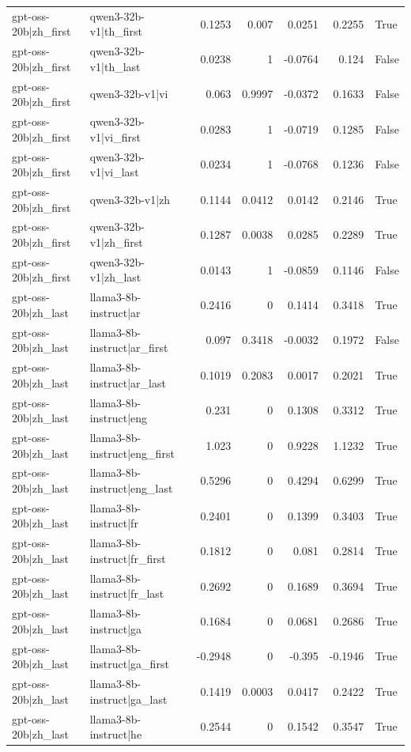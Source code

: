 \begin{table}
\begin{tabular}{l l r r r r l}
gpt-oss-20b|zh_first & qwen3-32b-v1|th_first & 0.1253 & 0.007 & 0.0251 & 0.2255 & True \\
gpt-oss-20b|zh_first & qwen3-32b-v1|th_last & 0.0238 & 1 & -0.0764 & 0.124 & False \\
gpt-oss-20b|zh_first & qwen3-32b-v1|vi & 0.063 & 0.9997 & -0.0372 & 0.1633 & False \\
gpt-oss-20b|zh_first & qwen3-32b-v1|vi_first & 0.0283 & 1 & -0.0719 & 0.1285 & False \\
gpt-oss-20b|zh_first & qwen3-32b-v1|vi_last & 0.0234 & 1 & -0.0768 & 0.1236 & False \\
gpt-oss-20b|zh_first & qwen3-32b-v1|zh & 0.1144 & 0.0412 & 0.0142 & 0.2146 & True \\
gpt-oss-20b|zh_first & qwen3-32b-v1|zh_first & 0.1287 & 0.0038 & 0.0285 & 0.2289 & True \\
gpt-oss-20b|zh_first & qwen3-32b-v1|zh_last & 0.0143 & 1 & -0.0859 & 0.1146 & False \\
gpt-oss-20b|zh_last & llama3-8b-instruct|ar & 0.2416 & 0 & 0.1414 & 0.3418 & True \\
gpt-oss-20b|zh_last & llama3-8b-instruct|ar_first & 0.097 & 0.3418 & -0.0032 & 0.1972 & False \\
gpt-oss-20b|zh_last & llama3-8b-instruct|ar_last & 0.1019 & 0.2083 & 0.0017 & 0.2021 & True \\
gpt-oss-20b|zh_last & llama3-8b-instruct|eng & 0.231 & 0 & 0.1308 & 0.3312 & True \\
gpt-oss-20b|zh_last & llama3-8b-instruct|eng_first & 1.023 & 0 & 0.9228 & 1.1232 & True \\
gpt-oss-20b|zh_last & llama3-8b-instruct|eng_last & 0.5296 & 0 & 0.4294 & 0.6299 & True \\
gpt-oss-20b|zh_last & llama3-8b-instruct|fr & 0.2401 & 0 & 0.1399 & 0.3403 & True \\
gpt-oss-20b|zh_last & llama3-8b-instruct|fr_first & 0.1812 & 0 & 0.081 & 0.2814 & True \\
gpt-oss-20b|zh_last & llama3-8b-instruct|fr_last & 0.2692 & 0 & 0.1689 & 0.3694 & True \\
gpt-oss-20b|zh_last & llama3-8b-instruct|ga & 0.1684 & 0 & 0.0681 & 0.2686 & True \\
gpt-oss-20b|zh_last & llama3-8b-instruct|ga_first & -0.2948 & 0 & -0.395 & -0.1946 & True \\
gpt-oss-20b|zh_last & llama3-8b-instruct|ga_last & 0.1419 & 0.0003 & 0.0417 & 0.2422 & True \\
gpt-oss-20b|zh_last & llama3-8b-instruct|he & 0.2544 & 0 & 0.1542 & 0.3547 & True \\

\end{tabular}
\end{table}
